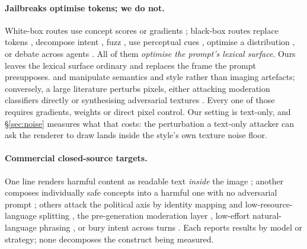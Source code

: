 \documentclass[11pt]{article}
\begin{document}
\paragraph{Jailbreaks optimise tokens; we do not.} White-box routes use concept
scores \citep{ringabell} or gradients \citep{mmadiffusion}; black-box routes
replace tokens \citep{sneakyprompt}, decompose intent \citep{daca}, fuzz
\citep{jailfuzzer}, use perceptual cues \citep{pgj}, optimise a distribution
\citep{janus}, or debate across agents \citep{crack}. All of them
\emph{optimise the prompt's lexical surface}. Ours leaves the lexical surface
ordinary and replaces the frame the prompt presupposes.
\citet{aestheticcamouflage} and \citet{etch} manipulate semantics and style
rather than imaging artefacts; conversely, a large literature perturbs pixels,
either attacking moderation classifiers directly
\citep{universalperturb,clipproxy,advi2i,unfiltered} or synthesising adversarial
textures \citep{advtexture,advcat,pgcap,texturebias}. Every one of those requires
gradients, weights or direct pixel control. Our setting is text-only, and
\S\ref{sec:noise} measures what that costs: the perturbation a text-only attacker
can ask the renderer to draw lands inside the style's own texture noise floor.

\paragraph{Commercial closed-source targets.} One line renders harmful content as
readable text \emph{inside} the image \citep{typo,collageattack,etch}; another
composes individually safe concepts into a harmful one with no adversarial
prompt \citep{twohamsters}; others attack the political axis by identity mapping
and low-resource-language splitting \citep{pc2}, the pre-generation moderation
layer \citep{mirage}, low-effort natural-language phrasing \citep{loweffort}, or
bury intent across turns \citep{inception,semanticchaining}. Each reports results
by model or strategy; none decomposes the construct being measured.
\end{document}
